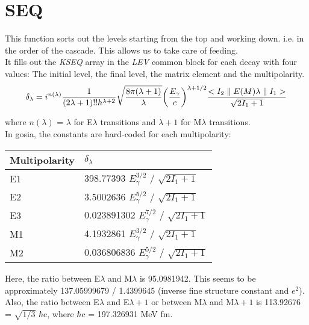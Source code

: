\section{SEQ}
\label{sect:seq}

\noindent This function sorts out the levels starting from the top and
working down. i.e. in the order of the cascade. This allows us to take care
of feeding.\\

\noindent It fills out the {\em KSEQ} array in the {\em LEV} common block
for each decay with four values: The initial level, the final level, the
matrix element and the multipolarity.\\

\begin{equation}
\delta_\lambda =
i^{n(\lambda)}
{1 \over (2 \lambda + 1)!! h^{\lambda + 2}}
\sqrt{8 \pi (\lambda + 1) \over \lambda}
\bigg({E_\gamma \over c}\bigg)^{\lambda + 1/2}
{<I_2 \parallel E(M)\lambda \parallel I_1> \over \sqrt{2 I_1 + 1}}
\end{equation}

\noindent where $n(\lambda)$ = $\lambda$ for E$\lambda$ transitions and
$\lambda + 1$ for M$\lambda$ transitions.\\

\noindent In gosia, the constants are hard-coded for each multipolarity:\\

\begin{center}
\begin{tabular}{|ll|}
\hline
Multipolarity & $\delta_\lambda$\\
\hline
E1 & 398.77393 $E_\gamma^{3/2}$ / $\sqrt{2 I_1 + 1}$\\
E2 & 3.5002636 $E_\gamma^{5/2}$ / $\sqrt{2 I_1 + 1}$\\
E3 & 0.023891302 $E_\gamma^{7/2}$ / $\sqrt{2 I_1 + 1}$\\
M1 & 4.1932861 $E_\gamma^{3/2}$ / $\sqrt{2 I_1 + 1}$\\
M2 & 0.036806836 $E_\gamma^{5/2}$ / $\sqrt{2 I_1 + 1}$\\
\hline
\end{tabular}
\end{center}

\noindent Here, the ratio between E$\lambda$ and M$\lambda$ is 95.0981942.
This seems to be approximately 137.05999679 / 1.4399645 (inverse fine
structure constant and $e^2$).\\


\noindent Also, the ratio between E$\lambda$ and E$\lambda+1$ or between
M$\lambda$ and M$\lambda+1$ is 113.92676 = $\sqrt{1/3}$ $\hbar$c, where
$\hbar$c = 197.326931 MeV fm.\\
